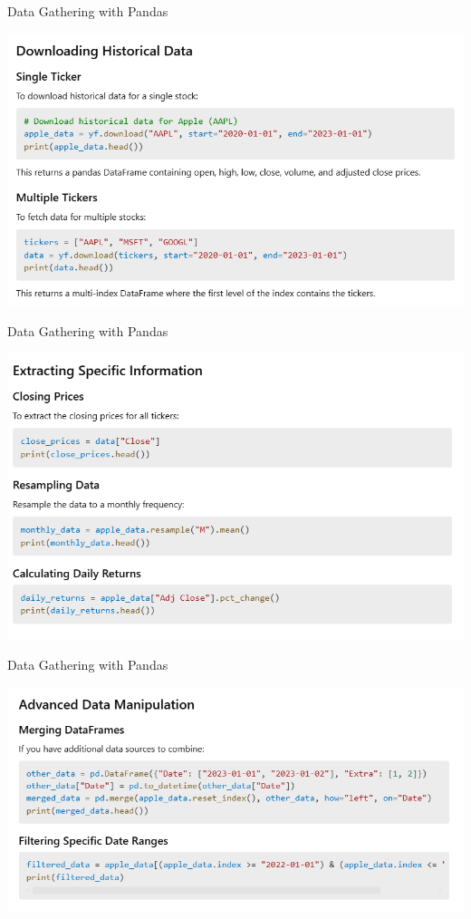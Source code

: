 \documentclass[11pt]{beamer}
\begin{document}
\begin{frame}{Data Gathering with Pandas}
	\begin{center}
	\includegraphics[scale=0.55]{../05-pictures/lesson-1-3_pic_15.png}
	\end{center}
\end{frame}
\begin{frame}{Data Gathering with Pandas}
	\begin{center}
	\includegraphics[scale=0.55]{../05-pictures/lesson-1-3_pic_16.png}
	\end{center}
\end{frame}
\begin{frame}{Data Gathering with Pandas}
	\begin{center}
	\includegraphics[scale=0.55]{../05-pictures/lesson-1-3_pic_17.png}
	\end{center}
\end{frame}
\end{document}
